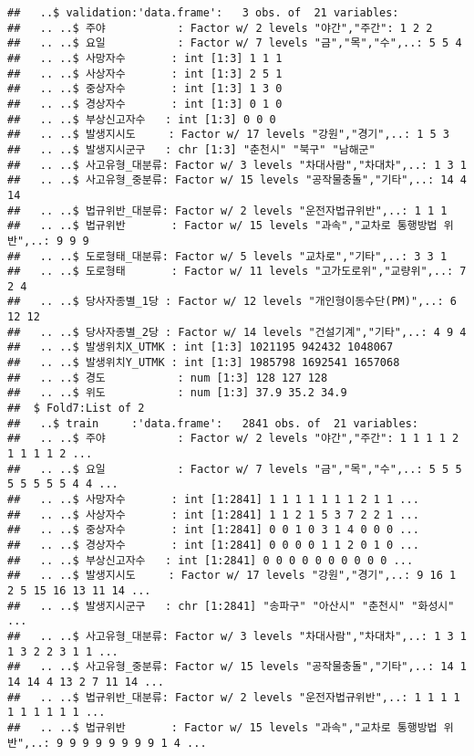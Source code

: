 \documentclass[]{article}
\begin{document}
\begin{verbatim}
##   ..$ validation:'data.frame':   3 obs. of  21 variables:
##   .. ..$ 주야           : Factor w/ 2 levels "야간","주간": 1 2 2
##   .. ..$ 요일           : Factor w/ 7 levels "금","목","수",..: 5 5 4
##   .. ..$ 사망자수       : int [1:3] 1 1 1
##   .. ..$ 사상자수       : int [1:3] 2 5 1
##   .. ..$ 중상자수       : int [1:3] 1 3 0
##   .. ..$ 경상자수       : int [1:3] 0 1 0
##   .. ..$ 부상신고자수   : int [1:3] 0 0 0
##   .. ..$ 발생지시도     : Factor w/ 17 levels "강원","경기",..: 1 5 3
##   .. ..$ 발생지시군구   : chr [1:3] "춘천시" "북구" "남해군"
##   .. ..$ 사고유형_대분류: Factor w/ 3 levels "차대사람","차대차",..: 1 3 1
##   .. ..$ 사고유형_중분류: Factor w/ 15 levels "공작물충돌","기타",..: 14 4 14
##   .. ..$ 법규위반_대분류: Factor w/ 2 levels "운전자법규위반",..: 1 1 1
##   .. ..$ 법규위반       : Factor w/ 15 levels "과속","교차로 통행방법 위반",..: 9 9 9
##   .. ..$ 도로형태_대분류: Factor w/ 5 levels "교차로","기타",..: 3 3 1
##   .. ..$ 도로형태       : Factor w/ 11 levels "고가도로위","교량위",..: 7 2 4
##   .. ..$ 당사자종별_1당 : Factor w/ 12 levels "개인형이동수단(PM)",..: 6 12 12
##   .. ..$ 당사자종별_2당 : Factor w/ 14 levels "건설기계","기타",..: 4 9 4
##   .. ..$ 발생위치X_UTMK : int [1:3] 1021195 942432 1048067
##   .. ..$ 발생위치Y_UTMK : int [1:3] 1985798 1692541 1657068
##   .. ..$ 경도           : num [1:3] 128 127 128
##   .. ..$ 위도           : num [1:3] 37.9 35.2 34.9
##  $ Fold7:List of 2
##   ..$ train     :'data.frame':   2841 obs. of  21 variables:
##   .. ..$ 주야           : Factor w/ 2 levels "야간","주간": 1 1 1 1 2 1 1 1 1 2 ...
##   .. ..$ 요일           : Factor w/ 7 levels "금","목","수",..: 5 5 5 5 5 5 5 5 4 4 ...
##   .. ..$ 사망자수       : int [1:2841] 1 1 1 1 1 1 1 2 1 1 ...
##   .. ..$ 사상자수       : int [1:2841] 1 1 2 1 5 3 7 2 2 1 ...
##   .. ..$ 중상자수       : int [1:2841] 0 0 1 0 3 1 4 0 0 0 ...
##   .. ..$ 경상자수       : int [1:2841] 0 0 0 0 1 1 2 0 1 0 ...
##   .. ..$ 부상신고자수   : int [1:2841] 0 0 0 0 0 0 0 0 0 0 ...
##   .. ..$ 발생지시도     : Factor w/ 17 levels "강원","경기",..: 9 16 1 2 5 15 16 13 11 14 ...
##   .. ..$ 발생지시군구   : chr [1:2841] "송파구" "아산시" "춘천시" "화성시" ...
##   .. ..$ 사고유형_대분류: Factor w/ 3 levels "차대사람","차대차",..: 1 3 1 1 3 2 2 3 1 1 ...
##   .. ..$ 사고유형_중분류: Factor w/ 15 levels "공작물충돌","기타",..: 14 1 14 14 4 13 2 7 11 14 ...
##   .. ..$ 법규위반_대분류: Factor w/ 2 levels "운전자법규위반",..: 1 1 1 1 1 1 1 1 1 1 ...
##   .. ..$ 법규위반       : Factor w/ 15 levels "과속","교차로 통행방법 위반",..: 9 9 9 9 9 9 9 9 1 4 ...

\end{verbatim}
\end{document}
